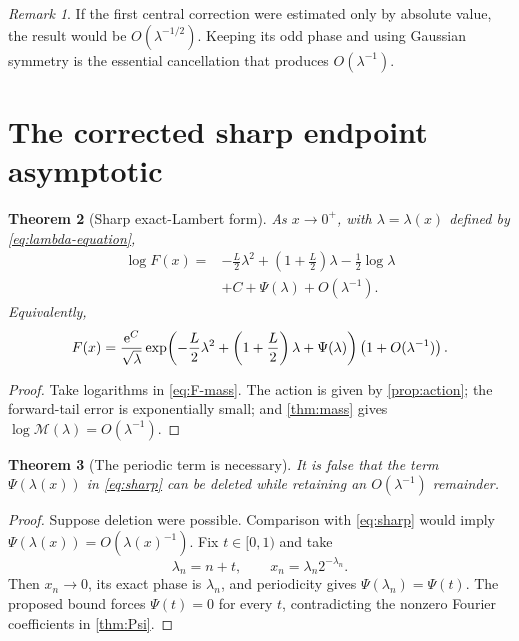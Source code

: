 \documentclass[11pt]{article}
\newtheorem{theorem}{Theorem}[section]
\theoremstyle{definition}
\theoremstyle{remark}
\newtheorem{remark}[theorem]{Remark}
\begin{document}
\begin{remark}
If the first central correction were estimated only by absolute value, the result would be $O(\lambda^{-1/2})$.  Keeping its odd phase and using Gaussian symmetry is the essential cancellation that produces $O(\lambda^{-1})$.
\end{remark}

\section{The corrected sharp endpoint asymptotic}\label{sec:sharp}
\begin{theorem}[Sharp exact-Lambert form]\label{thm:sharp}
As $x\to0^+$, with $\lambda=\lambda(x)$ defined by \eqref{eq:lambda-equation},
\begin{equation}\label{eq:sharp}
\boxed{\begin{aligned}
 \log F(x)={}&-\frac L2\lambda^2
 +\left(1+\frac L2\right)\lambda
 -\frac12\log\lambda\\
 &+C+\Psi(\lambda)+O(\lambda^{-1}).
\end{aligned}}
\end{equation}
Equivalently,
\begin{equation}\label{eq:sharp-multiplicative}
 F(x)=\frac{\mathrm e^C}{\sqrt\lambda}
 \exp\!\left(-\frac L2\lambda^2+
 \left(1+\frac L2\right)\lambda+\Psi(\lambda)\right)
 \left(1+O(\lambda^{-1})\right).
\end{equation}
\end{theorem}
\begin{proof}
Take logarithms in \eqref{eq:F-mass}.  The action is given by \cref{prop:action}; the forward-tail error is exponentially small; and \cref{thm:mass} gives $\log\mathcal M(\lambda)=O(\lambda^{-1})$.
\end{proof}

\begin{theorem}[The periodic term is necessary]\label{thm:periodic-necessary}
It is false that the term $\Psi(\lambda(x))$ in \eqref{eq:sharp} can be deleted while retaining an $O(\lambda^{-1})$ remainder.
\end{theorem}
\begin{proof}
Suppose deletion were possible.  Comparison with \eqref{eq:sharp} would imply $\Psi(\lambda(x))=O(\lambda(x)^{-1})$.  Fix $t\in[0,1)$ and take
\[
 \lambda_n=n+t,
 \qquad x_n=\lambda_n2^{-\lambda_n}.
\]
Then $x_n\to0$, its exact phase is $\lambda_n$, and periodicity gives
$\Psi(\lambda_n)=\Psi(t)$.  The proposed bound forces $\Psi(t)=0$ for every $t$, contradicting the nonzero Fourier coefficients in \cref{thm:Psi}.
\end{proof}
\end{document}
